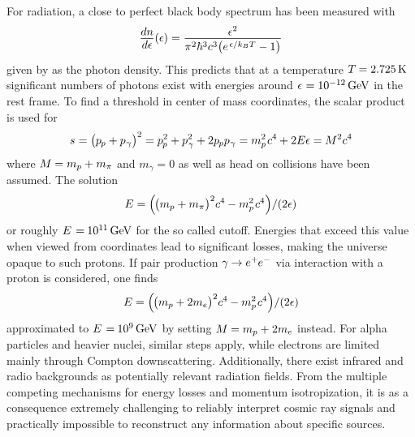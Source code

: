 For  radiation, a close to perfect black body spectrum has been measured with
\begin{equation*}
	\frac{\raisebox{-0.3ex}{$dn$}}{\raisebox{0.15ex}{$d\epsilon$}} (\epsilon) \kern+0.2pt =
	\frac{\raisebox{-0.3ex}{$\epsilon^2$}}{\pi^2 \hbar^3 c^3 \bigl( e^{\kern+1.0pt \epsilon / k_B T} - 1 \bigr)}
\end{equation*}
given by \cite{Gaisser_2016} as the photon density. This predicts that at a temperature $T \kern-0.5pt = \qty{2.725}{\kelvin}$
significant numbers of photons exist with energies around $\epsilon \kern+0.5pt = \qty{e-12}{\giga\electronvolt}$
in the  rest frame. To find a threshold in center of mass coordinates, the scalar product is used for
\begin{equation*}
	s \kern+0.3pt = \bigl( p_{\kern-0.5pt p} + p_{\kern+0.5pt \gamma} \bigr)^2 =
	p_{\kern-0.5pt p}^2 + p_{\kern+0.5pt \gamma}^2 + 2 p_{\kern-0.5pt p} p_{\kern+0.5pt \gamma} =
	m_p^2 \kern+0.8pt c^4 \kern-0.2pt + 2 E \epsilon = \kern-0.2pt M^2c^4
\end{equation*}
where $M \kern-0.3pt = m_p + \kern+0.3pt m_\pi$ and $m_\gamma = 0$ as well as head on collisions have been assumed. The solution
\begin{equation*}
	E = \Bigl( \kern-1.0pt \bigl( m_p + m_\pi \bigr)^2 c^4 \kern-0.2pt - m_p^2 \kern+0.8pt c^4 \Bigr) / (2\epsilon)
\end{equation*}
or roughly $E \kern+1.0pt = \kern-0.5pt \qty{e+11}{\giga\electronvolt}$ for the so called  cutoff. Energies that exceed
this value when viewed from  coordinates lead to significant losses, making the universe opaque to such protons.
If pair production $\gamma \kern-0.5pt \rightarrow \smash{e^+ \kern-0.5pt e^-}$ via interaction with a proton is considered,
one finds
\begin{equation*}
	E = \Bigl( \kern-1.0pt \bigl( m_p + 2m_e \bigr)^2 c^4 \kern-0.2pt - m_p^2 \kern+0.8pt c^4 \Bigr) / (2\epsilon)
\end{equation*}
approximated to $E \kern+1.0pt = \kern-0.5pt \qty{e+9}{\giga\electronvolt}$ by setting $M \kern-0.3pt = m_p + \kern+0.3pt 2m_e$
instead. For alpha particles and heavier nuclei, similar steps apply, while electrons are limited mainly through Compton
downscattering. Additionally, there exist infrared and radio backgrounds as potentially relevant radiation fields. From
the multiple competing mechanisms for energy losses and momentum isotropization, it is as a consequence extremely challenging
to reliably interpret cosmic ray signals and practically impossible to reconstruct any information about specific sources.



